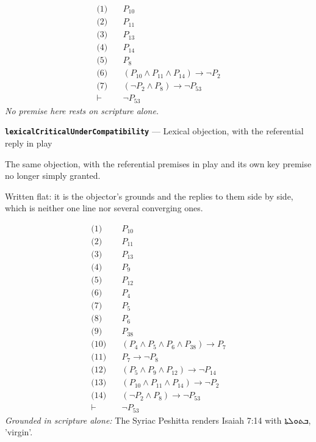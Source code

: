 \documentclass[11pt]{article}
\begin{document}
\begin{align*}
  \text{(1)} \quad & P_{10} \\
  \text{(2)} \quad & P_{11} \\
  \text{(3)} \quad & P_{13} \\
  \text{(4)} \quad & P_{14} \\
  \text{(5)} \quad & P_{8} \\
  \text{(6)} \quad & (P_{10} \land P_{11} \land P_{14}) \rightarrow \lnot P_{2} \\
  \text{(7)} \quad & (\lnot P_{2} \land P_{8}) \rightarrow \lnot P_{53} \\
  \vdash \quad & \lnot P_{53}
\end{align*}
\emph{No premise here rests on scripture alone.}
\par\medskip\noindent\textbf{\texttt{lexical\allowbreak{}Critical\allowbreak{}Under\allowbreak{}Compatibility}} --- Lexical objection, with the referential reply in play\par\nobreak\noindent
The same objection, with the referential premises in play and its own key premise no longer simply granted.

Written flat: it is the objector's grounds and the replies to them side by side, which is neither one line nor several converging ones.

\begin{align*}
  \text{(1)} \quad & P_{10} \\
  \text{(2)} \quad & P_{11} \\
  \text{(3)} \quad & P_{13} \\
  \text{(4)} \quad & P_{9} \\
  \text{(5)} \quad & P_{12} \\
  \text{(6)} \quad & P_{4} \\
  \text{(7)} \quad & P_{5} \\
  \text{(8)} \quad & P_{6} \\
  \text{(9)} \quad & P_{38} \\
  \text{(10)} \quad & (P_{4} \land P_{5} \land P_{6} \land P_{38}) \rightarrow P_{7} \\
  \text{(11)} \quad & P_{7} \rightarrow \lnot P_{8} \\
  \text{(12)} \quad & (P_{5} \land P_{9} \land P_{12}) \rightarrow \lnot P_{14} \\
  \text{(13)} \quad & (P_{10} \land P_{11} \land P_{14}) \rightarrow \lnot P_{2} \\
  \text{(14)} \quad & (\lnot P_{2} \land P_{8}) \rightarrow \lnot P_{53} \\
  \vdash \quad & \lnot P_{53}
\end{align*}
\emph{Grounded in scripture alone:} The Syriac Peshitta renders Isaiah 7:14 with ܒܬܘܠܬܐ, 'virgin'.
\end{document}
